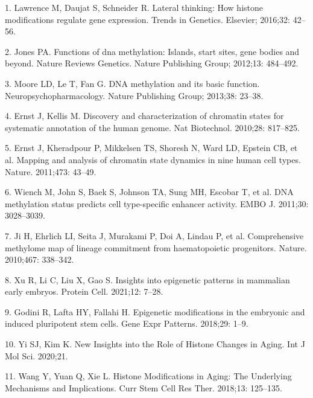 \documentclass[10pt,letterpaper]{article}
\newenvironment{cslreferences}%
  {}%
  {\par}
\begin{document}
\hypertarget{refs}{}
\begin{cslreferences}
\leavevmode\hypertarget{ref-lawrence2016lateral}{}%
1. Lawrence M, Daujat S, Schneider R. Lateral thinking: How histone
modifications regulate gene expression. Trends in Genetics. Elsevier;
2016;32: 42--56.

\leavevmode\hypertarget{ref-jones2012functions}{}%
2. Jones PA. Functions of dna methylation: Islands, start sites, gene
bodies and beyond. Nature Reviews Genetics. Nature Publishing Group;
2012;13: 484--492.

\leavevmode\hypertarget{ref-moore2013dna}{}%
3. Moore LD, Le T, Fan G. DNA methylation and its basic function.
Neuropsychopharmacology. Nature Publishing Group; 2013;38: 23--38.

\leavevmode\hypertarget{ref-pmid20657582}{}%
4. Ernst J, Kellis M. Discovery and characterization of chromatin states
for systematic annotation of the human genome. Nat Biotechnol. 2010;28:
817--825.

\leavevmode\hypertarget{ref-pmid21441907}{}%
5. Ernst J, Kheradpour P, Mikkelsen TS, Shoresh N, Ward LD, Epstein CB,
et al. Mapping and analysis of chromatin state dynamics in nine human
cell types. Nature. 2011;473: 43--49.

\leavevmode\hypertarget{ref-pmid21701563}{}%
6. Wiench M, John S, Baek S, Johnson TA, Sung MH, Escobar T, et al. DNA
methylation status predicts cell type-specific enhancer activity. EMBO
J. 2011;30: 3028--3039.

\leavevmode\hypertarget{ref-pmid20720541}{}%
7. Ji H, Ehrlich LI, Seita J, Murakami P, Doi A, Lindau P, et al.
Comprehensive methylome map of lineage commitment from haematopoietic
progenitors. Nature. 2010;467: 338--342.

\leavevmode\hypertarget{ref-pmid32671792}{}%
8. Xu R, Li C, Liu X, Gao S. Insights into epigenetic patterns in
mammalian early embryos. Protein Cell. 2021;12: 7--28.

\leavevmode\hypertarget{ref-pmid29625185}{}%
9. Godini R, Lafta HY, Fallahi H. Epigenetic modifications in the
embryonic and induced pluripotent stem cells. Gene Expr Patterns.
2018;29: 1--9.

\leavevmode\hypertarget{ref-pmid33153221}{}%
10. Yi SJ, Kim K. New Insights into the Role of Histone Changes in
Aging. Int J Mol Sci. 2020;21.

\leavevmode\hypertarget{ref-pmid28820059}{}%
11. Wang Y, Yuan Q, Xie L. Histone Modifications in Aging: The
Underlying Mechanisms and Implications. Curr Stem Cell Res Ther.
2018;13: 125--135.


\end{cslreferences}
\end{document}
